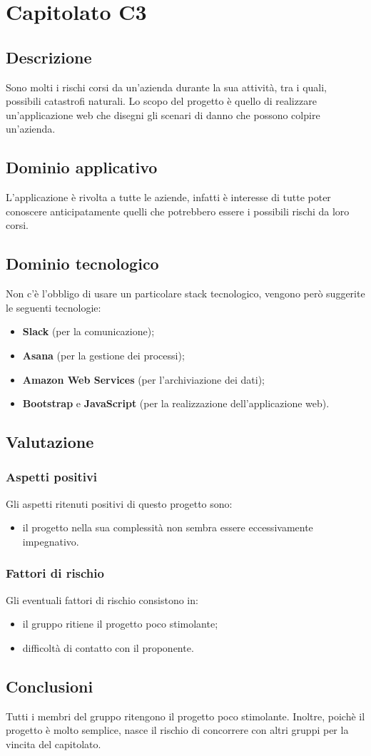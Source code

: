\section {Capitolato C3}
	\subsection {Descrizione}
		Sono molti i rischi corsi da un'azienda durante la sua attività, tra i quali, possibili catastrofi naturali. Lo scopo del progetto è quello di realizzare un'applicazione web che disegni gli scenari di
		danno che possono colpire un'azienda.
	\subsection {Dominio applicativo}
		L'applicazione è rivolta a tutte le aziende, infatti è interesse di tutte poter conoscere anticipatamente quelli che potrebbero essere i possibili rischi da loro corsi.
	\subsection {Dominio tecnologico}
		Non c'è l'obbligo di usare un particolare stack tecnologico, vengono però suggerite le seguenti tecnologie:
		\begin{itemize}
			\item \textbf{Slack} (per la comunicazione);
			\item \textbf{Asana} (per la gestione dei processi);
			\item \textbf{Amazon Web Services} (per l'archiviazione dei dati);
			\item \textbf{Bootstrap} e \textbf{JavaScript} (per la realizzazione dell'applicazione web).
		\end{itemize}
	\subsection {Valutazione}
		\subsubsection {Aspetti positivi}
		Gli aspetti ritenuti positivi di questo progetto sono:
			\begin{itemize}
				\item il progetto nella sua complessità non sembra essere eccessivamente impegnativo.
			\end{itemize}
		\subsubsection {Fattori di rischio}
		Gli eventuali fattori di rischio consistono in:
			\begin{itemize}
				\item il gruppo ritiene il progetto poco stimolante;
				\item difficoltà di contatto con il proponente.
			\end{itemize}
	\subsection {Conclusioni}
		Tutti i membri del gruppo ritengono il progetto poco stimolante. Inoltre, poichè il progetto è molto semplice, nasce il rischio di concorrere con altri gruppi per la vincita del capitolato.